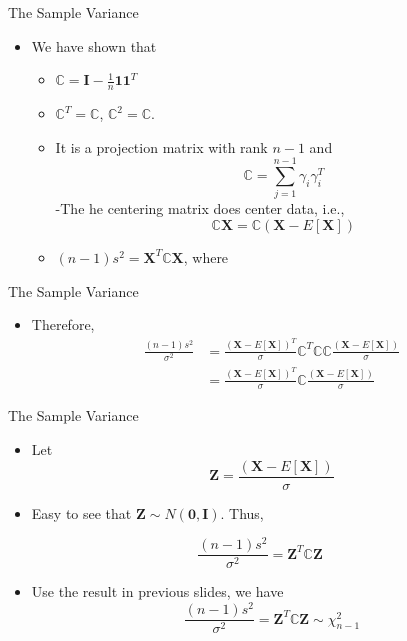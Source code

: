 \documentclass[
  ignorenonframetext,
]{beamer}
\providecommand{\tightlist}{%
  \setlength{\itemsep}{0pt}\setlength{\parskip}{0pt}}
\begin{document}
\begin{frame}{The Sample Variance}
\protect\hypertarget{the-sample-variance}{}
\begin{itemize}
\tightlist
\item
  We have shown that

  \begin{itemize}
  \tightlist
  \item
    \(\mathbb C = \mathbf I - \frac{1}{n} \mathbf 1 \mathbf 1^T\)
  \item
    \(\mathbb C^T=\mathbb C\), \(\mathbb C^2=\mathbb C\).
  \item
    It is a projection matrix with rank \(n-1\) and
    \[\mathbb C = \sum_{j=1}^{n-1}\gamma_i\gamma_i^T\] -The he centering
    matrix does center data, i.e.,
    \[\mathbb C \mathbf X = \mathbb C (\mathbf X - E[\mathbf X])\]
  \item
    \((n-1)s^2=\mathbf X^T\mathbb C \mathbf X\), where
  \end{itemize}
\end{itemize}
\end{frame}

\begin{frame}{The Sample Variance}
\protect\hypertarget{the-sample-variance-1}{}
\begin{itemize}
\tightlist
\item
  Therefore, \[
  \begin{aligned}
  \frac{(n-1)s^2}{\sigma^2}&=\frac{(\mathbf X - E[\mathbf X])^T}{\sigma}\mathbb C^T \mathbb C \mathbb C \frac{(\mathbf X - E[\mathbf X])}{\sigma}\\
  &=\frac{(\mathbf X - E[\mathbf X])^T}{\sigma}\mathbb C \frac{(\mathbf X - E[\mathbf X])}{\sigma}
  \end{aligned}\]
\end{itemize}
\end{frame}

\begin{frame}{The Sample Variance}
\protect\hypertarget{the-sample-variance-2}{}
\begin{itemize}
\tightlist
\item
  Let \[\mathbf Z=\frac{(\mathbf X - E[\mathbf X])}{\sigma}\]
\item
  Easy to see that \(\mathbf Z\sim N(\mathbf 0, \mathbf I)\). Thus,
\end{itemize}

\[\frac{(n-1)s^2}{\sigma^2}=\mathbf Z^T \mathbb C \mathbf Z\]

\begin{itemize}
\tightlist
\item
  Use the result in previous slides, we have
  \[\frac{(n-1)s^2}{\sigma^2}=\mathbf Z^T \mathbb C \mathbf Z \sim \chi_{n-1}^2\]
\end{itemize}
\end{frame}
\end{document}
